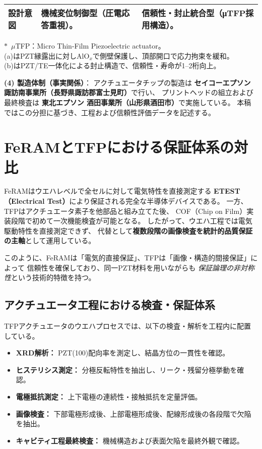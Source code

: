 \documentclass[conference]{IEEEtran}
\begin{document}
\begin{table}[!t]
\begin{tabular}{@{}p{2.8cm}p{3.2cm}p{3.2cm}@{}}
\textbf{設計意図} &
機械変位制御型（圧電応答重視）。 &
信頼性・封止統合型（μTFP採用構造）。 \\
\bottomrule
\end{tabular}
\vspace{-3pt}
\begin{flushleft}
\footnotesize
$\ast$~$\mu$TFP：Micro Thin-Film Piezoelectric actuator。\\
(a)はPZT縁露出に対しAlO$_x$で側壁保護し、頂部開口で応力拘束を緩和。\\
(b)はPZT/TE一体化による封止構造で、信頼性・寿命が1--2桁向上。
\end{flushleft}
\end{table}

\medskip
\noindent
\textbf{(4) 製造体制（事実関係）}：
アクチュエータチップの製造は
\textbf{セイコーエプソン 諏訪南事業所（長野県諏訪郡富士見町）}で行い、
プリントヘッドの組立および最終検査は
\textbf{東北エプソン 酒田事業所（山形県酒田市）}で実施している。
本稿ではこの分担に基づき、工程および信頼性評価データを記述する。

\section{FeRAMとTFPにおける保証体系の対比}
FeRAMはウエハレベルで全セルに対して電気特性を直接測定する
\textbf{ETEST（Electrical Test）}により保証される完全な半導体デバイスである。
一方、TFPはアクチュエータ素子を他部品と組み立てた後、
COF（Chip on Film）実装段階で初めて一次機能検査が可能となる。
したがって、ウエハ工程では電気駆動特性を直接測定できず、
代替として\textbf{複数段階の画像検査を統計的品質保証の主軸}として運用している。

このように、FeRAMは「電気的直接保証」、TFPは「画像・構造的間接保証」によって
信頼性を確保しており、同一PZT材料を用いながらも
\emph{保証論理の非対称性}という技術的特徴を持つ。

\subsection{アクチュエータ工程における検査・保証体系}
TFPアクチュエータのウエハプロセスでは、以下の検査・解析を工程内に配置している。
\begin{itemize}
  \item \textbf{XRD解析：} PZT(100)配向率を測定し、結晶方位の一貫性を確認。
  \item \textbf{ヒステリシス測定：} 分極反転特性を抽出し、リーク・残留分極挙動を確認。
  \item \textbf{電極抵抗測定：} 上下電極の連続性・接触抵抗を定量評価。
  \item \textbf{画像検査：} 下部電極形成後、上部電極形成後、配線形成後の各段階で欠陥を抽出。
  \item \textbf{キャビティ工程最終検査：} 機械構造および表面欠陥を最終外観で確認。
\end{itemize}
\end{document}
